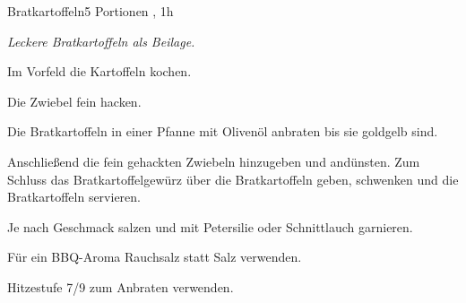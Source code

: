 \documentclass[../recipe-collections/cooking.tex]{subfiles}
\begin{document}
\begin{recipe}{Bratkartoffeln}{5 Portionen }{, 1h }

  \freeform{}\textit{Leckere Bratkartoffeln als Beilage.}


  Im Vorfeld die Kartoffeln kochen.


  Die Zwiebel fein hacken.


  Die Bratkartoffeln in einer Pfanne mit Olivenöl anbraten bis sie goldgelb sind.


  Anschließend die fein gehackten Zwiebeln hinzugeben und andünsten.
  Zum Schluss das Bratkartoffelgewürz über die Bratkartoffeln geben, schwenken und die Bratkartoffeln servieren.


  Je nach Geschmack salzen und mit Petersilie oder Schnittlauch garnieren.

  \freeform{}\hrulefill{}

  \freeform{}
  Für ein BBQ-Aroma Rauchsalz statt Salz verwenden.

  \freeform{}
  Hitzestufe 7/9 zum Anbraten verwenden.

\end{recipe}
\end{document}
